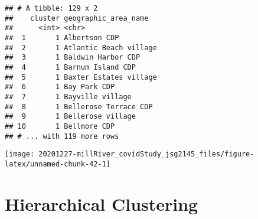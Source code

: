 \documentclass[
]{article}
\newenvironment{Shaded}{\begin{snugshade}}{\end{snugshade}}
\newcommand{\CommentTok}[1]{\textcolor[rgb]{0.56,0.35,0.01}{\textit{#1}}}
\newcommand{\DataTypeTok}[1]{\textcolor[rgb]{0.13,0.29,0.53}{#1}}
\newcommand{\DecValTok}[1]{\textcolor[rgb]{0.00,0.00,0.81}{#1}}
\newcommand{\KeywordTok}[1]{\textcolor[rgb]{0.13,0.29,0.53}{\textbf{#1}}}
\newcommand{\NormalTok}[1]{#1}
\newcommand{\OperatorTok}[1]{\textcolor[rgb]{0.81,0.36,0.00}{\textbf{#1}}}
\newcommand{\StringTok}[1]{\textcolor[rgb]{0.31,0.60,0.02}{#1}}
\begin{document}
\begin{Shaded}
\end{Shaded}

\begin{verbatim}
## # A tibble: 129 x 2
##    cluster geographic_area_name  
##      <int> <chr>                 
##  1       1 Albertson CDP         
##  2       1 Atlantic Beach village
##  3       1 Baldwin Harbor CDP    
##  4       1 Barnum Island CDP     
##  5       1 Baxter Estates village
##  6       1 Bay Park CDP          
##  7       1 Bayville village      
##  8       1 Bellerose Terrace CDP 
##  9       1 Bellerose village     
## 10       1 Bellmore CDP          
## # ... with 119 more rows
\end{verbatim}

\begin{Shaded}
\end{Shaded}

\texttt{[image: 20201227-millRiver\_covidStudy\_jsg2145\_files/figure-latex/unnamed-chunk-42-1]}

\hypertarget{hierarchical-clustering}{%
\section{Hierarchical Clustering}\label{hierarchical-clustering}}
\end{document}
